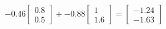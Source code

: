 \documentclass[preview]{standalone}
\begin{document}
\begin{align*}
-0.46 \begin{bmatrix} 0.8 \\ 0.5 \end{bmatrix} + -0.88 \begin{bmatrix} 1 \\ 1.6 \end{bmatrix} = \begin{bmatrix} -1.24 \\ -1.63 \end{bmatrix}
\end{align*}
\end{document}
